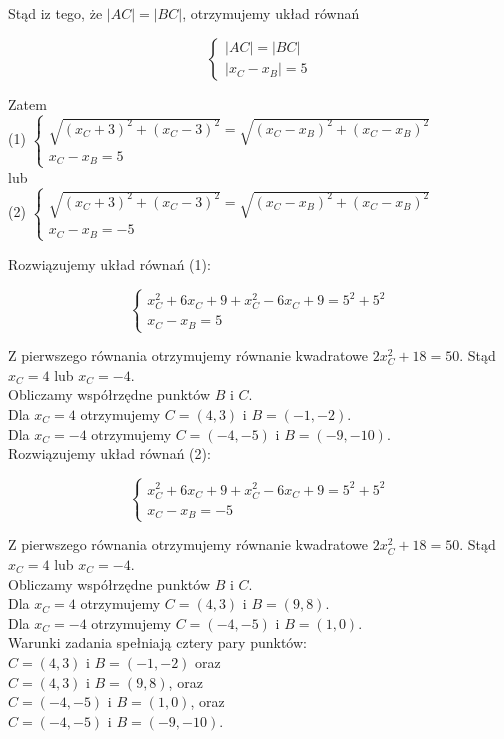 \documentclass[10pt]{article}
\begin{document}
Stąd iz tego, że $|A C|=|B C|$, otrzymujemy układ równań

$$
\left\{\begin{array}{l}
|A C|=|B C| \\
\left|x_{C}-x_{B}\right|=5
\end{array}\right.
$$

Zatem\\
(1) $\left\{\begin{array}{l}\sqrt{\left(x_{C}+3\right)^{2}+\left(x_{C}-3\right)^{2}}=\sqrt{\left(x_{C}-x_{B}\right)^{2}+\left(x_{C}-x_{B}\right)^{2}} \\ x_{C}-x_{B}=5\end{array}\right.$\\
lub\\
(2) $\left\{\begin{array}{l}\sqrt{\left(x_{C}+3\right)^{2}+\left(x_{C}-3\right)^{2}}=\sqrt{\left(x_{C}-x_{B}\right)^{2}+\left(x_{C}-x_{B}\right)^{2}} \\ x_{C}-x_{B}=-5\end{array}\right.$

Rozwiązujemy układ równań (1):

$$
\left\{\begin{array}{l}
x_{C}^{2}+6 x_{C}+9+x_{C}^{2}-6 x_{C}+9=5^{2}+5^{2} \\
x_{C}-x_{B}=5
\end{array}\right.
$$

Z pierwszego równania otrzymujemy równanie kwadratowe $2 x_{C}^{2}+18=50$. Stąd $x_{C}=4$ lub $x_{C}=-4$.\\
Obliczamy współrzędne punktów $B$ i $C$.\\
Dla $x_{C}=4$ otrzymujemy $C=(4,3)$ i $B=(-1,-2)$.\\
Dla $x_{C}=-4$ otrzymujemy $C=(-4,-5)$ i $B=(-9,-10)$.\\
Rozwiązujemy układ równań (2):

$$
\left\{\begin{array}{l}
x_{C}^{2}+6 x_{C}+9+x_{C}^{2}-6 x_{C}+9=5^{2}+5^{2} \\
x_{C}-x_{B}=-5
\end{array}\right.
$$

Z pierwszego równania otrzymujemy równanie kwadratowe $2 x_{C}^{2}+18=50$. Stąd $x_{C}=4$ lub $x_{C}=-4$.\\
Obliczamy współrzędne punktów $B$ i $C$.\\
Dla $x_{C}=4$ otrzymujemy $C=(4,3)$ i $B=(9,8)$.\\
Dla $x_{C}=-4$ otrzymujemy $C=(-4,-5)$ i $B=(1,0)$.\\
Warunki zadania spełniają cztery pary punktów:\\
$C=(4,3)$ i $B=(-1,-2)$ oraz\\
$C=(4,3)$ i $B=(9,8)$, oraz\\
$C=(-4,-5)$ i $B=(1,0)$, oraz\\
$C=(-4,-5)$ i $B=(-9,-10)$.
\end{document}
